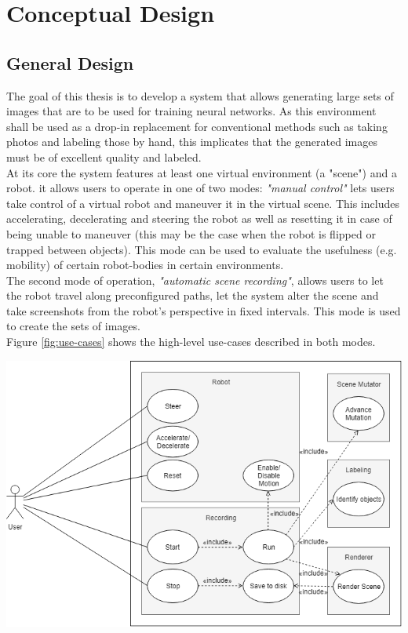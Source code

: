 \chapter{Conceptual Design}

\section{General Design}
The goal of this thesis is to develop a system that allows generating large sets of images that are to be used for training neural networks. As this environment shall be used as a drop-in replacement for conventional methods such as taking photos and labeling those by hand, this implicates that the generated images must be of excellent quality and labeled.\\
At its core the system features at least one virtual environment (a "scene") and a robot. it allows users to operate in one of two modes: \textit{"manual control"} lets users take control of a virtual robot and maneuver it in the virtual scene. This includes accelerating, decelerating and steering the robot as well as resetting it in case of being unable to maneuver (this may be the case when the robot is flipped or trapped between objects). This mode can be used to evaluate the usefulness (e.g. mobility) of certain robot-bodies in certain environments.\\
The second mode of operation, \textit{"automatic scene recording"}, allows users to let the robot travel along preconfigured paths, let the system alter the scene and take screenshots from the robot's perspective in fixed intervals. This mode is used to create the sets of images.\\
Figure \ref{fig:use-cases} shows the high-level use-cases described in both modes.

\begin{center}
\noindent\includegraphics[width=15cm]{tex/img/ch04/Use_Cases_02.png}
\label{fig:use-cases}
\end{center}


